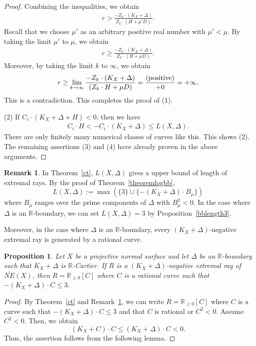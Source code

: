 \documentclass[12pt,twoside]{amsart}
\newtheorem{prop}[thm]{Proposition}
\theoremstyle{definition}
\newtheorem{rem}[thm]{Remark}
\begin{document}
\begin{proof}
Combining the inequalities, we obtain 
\begin{eqnarray*}
r>\frac{-Z_k\cdot (K_X+\Delta)}{Z_k\cdot (H+\mu'D)}.
\end{eqnarray*}
Recall that we choose $\mu'$ as an arbitrary positive real number with $\mu'<\mu$. 
By taking the limit $\mu'$ to $\mu$, we obtain 
\begin{eqnarray*}
r \geq \frac{-Z_k\cdot (K_X+\Delta)}{Z_k\cdot (H+\mu D)}.
\end{eqnarray*}
Moreover, by taking the limit $k$ to $\infty$, 
we obtain 
\begin{eqnarray*}
r \geq 
\lim_{k \to \infty}\frac{-Z_k\cdot (K_X+\Delta)}{(Z_k\cdot H+\mu D)}=
\frac{(\rm positive)}{+0}=+\infty.
\end{eqnarray*}
This is a contradiction. 
This completes the proof of (1).

(2)
If $C_i\cdot (K_X+\Delta+H)<0$, then we have 
\begin{eqnarray*}
C_i\cdot H<-C_i\cdot (K_X+\Delta) \leq L(X, \Delta).
\end{eqnarray*}
There are only finitely many numerical classes of curves like this. 
This shows (2). 
The remaining assertions (3) and (4) have already proven in the above arguments. 
\end{proof}


\begin{rem}\label{ray3}
In Theorem~\ref{ct}, $L(X, \Delta)$ gives a upper bound of length of extremal rays. 
By the proof of Theorem~\ref{theoremlogbb}, 
$$L(X, \Delta):=\max(\{3\} \cup \{-(K_X+\Delta)\cdot B_{\mu}\})$$
where $B_{\mu}$ ranges over the prime components of $\Delta$ with $B_{\mu}^2<0.$ 
In the case where $\Delta$ is an $\mathbb{R}$-boundary, 
we can set $L(X, \Delta)=3$ by Proposition~\ref{bblength3}.
\end{rem}

Moreover, in the case where $\Delta$ is an $\mathbb{R}$-boundary, 
every $(K_X+\Delta)$-negative extremal ray is generated by a rational curve. 

\begin{prop}\label{ext-rat-length1}
Let $X$ be a projective normal surface and 
let $\Delta$ be an $\mathbb{R}$-boundary such that $K_X+\Delta$ is $\mathbb{R}$-Cartier. 
If $R$ is a $(K_X+\Delta)$-negative extremal ray of $\overline{NE}(X)$, 
then $R=\mathbb R_{\geq 0}[C]$ where $C$ is a rational curve such that 
$-(K_X+\Delta)\cdot C\leq 3$.
\end{prop}

\begin{proof}
By Theorem~\ref{ct} and Remark~\ref{ray3}, 
we can write $R=\mathbb R_{\geq 0}[C]$ 
where $C$ is a curve such that $-(K_X+\Delta)\cdot C\leq 3$ and that 
$C$ is rational or $C^2<0.$ 
Assume $C^2<0$. 
Then, we obtain 
$$(K_X+C)\cdot C\leq (K_X+\Delta)\cdot C<0.$$
Thus, the assertion follows from the following lemma. 
\end{proof}
\end{document}

